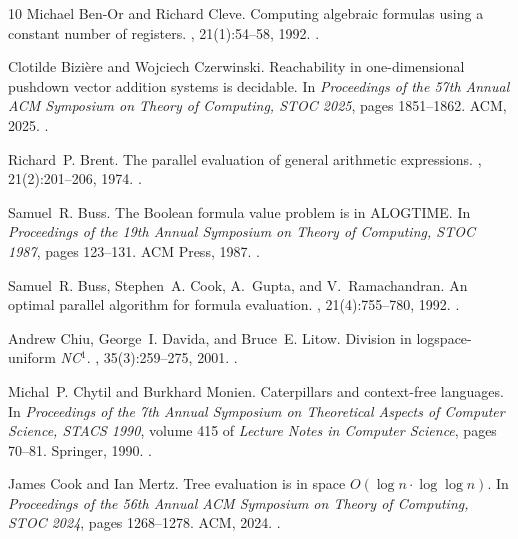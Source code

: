 \documentclass[a4paper,UKenglish,cleveref, autoref, thm-restate, numberwithinsect]{lipics-v2021}
\begin{document}
\begin{thebibliography}{10}
Michael Ben{-}Or and Richard Cleve.
\newblock Computing algebraic formulas using a constant number of registers.
, 21(1):54--58, 1992.
\newblock \href {https://doi.org/10.1137/0221006} {}.

Clotilde Bizi{\`{e}}re and Wojciech Czerwinski.
\newblock Reachability in one-dimensional pushdown vector addition systems is
  decidable.
\newblock In {\em Proceedings of the 57th Annual {ACM} Symposium on Theory of
  Computing, {STOC} 2025}, pages 1851--1862. {ACM}, 2025.
\newblock \href {https://doi.org/10.1145/3717823.3718149}
  {}.

Richard~P. Brent.
\newblock The parallel evaluation of general arithmetic expressions.
, 21(2):201--206, 1974.
\newblock \href {https://doi.org/10.1145/321812.321815}
  {}.

Samuel~R. Buss.
\newblock The {Boolean} formula value problem is in {ALOGTIME}.
\newblock In {\em Proceedings of the 19th {A}nnual {S}ymposium on {T}heory of
  {C}omputing, STOC 1987}, pages 123--131. ACM Press, 1987.
\newblock \href {https://doi.org/10.1145/28395.28409}
  {}.

Samuel~R. Buss, Stephen~A. Cook, A.~Gupta, and V.~Ramachandran.
\newblock An optimal parallel algorithm for formula evaluation.
, 21(4):755--780, 1992.
\newblock \href {https://doi.org/10.1137/0221046} {}.

Andrew Chiu, George~I. Davida, and Bruce~E. Litow.
\newblock Division in logspace-uniform \emph{NC}\({}^{\mbox{1}}\).
,
  35(3):259--275, 2001.
\newblock \href {https://doi.org/10.1051/ITA:2001119}
  {}.

Michal~P. Chytil and Burkhard Monien.
\newblock Caterpillars and context-free languages.
\newblock In {\em Proceedings of the 7th Annual Symposium on Theoretical
  Aspects of Computer Science, STACS 1990}, volume 415 of {\em Lecture Notes in
  Computer Science}, pages 70--81. Springer, 1990.
\newblock \href {https://doi.org/10.1007/3-540-52282-4}
  {}.

James Cook and Ian Mertz.
\newblock Tree evaluation is in space ${O}(\log n \cdot \log \log n)$.
\newblock In {\em Proceedings of the 56th Annual {ACM} Symposium on Theory of
  Computing, {STOC} 2024}, pages 1268--1278. {ACM}, 2024.
\newblock \href {https://doi.org/10.1145/3618260.3649664}
  {}.


\end{thebibliography}
\end{document}
